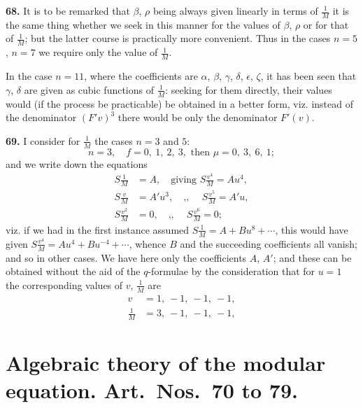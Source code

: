 \documentclass[11pt,a4paper]{book}
\begin{document}
\textbf{68.} It is to be remarked that $\beta$, $\rho$ being always given linearly in terms of $\frac{1}{M}$ it is the same thing whether we seek in this manner for the values of $\beta$, $\rho$ or for that of $\frac{1}{M}$; but the latter course is practically more convenient. Thus in the cases $n = 5$, $n = 7$ we require only the value of $\frac{1}{M}$.

In the case $n = 11$, where the coefficients are $\alpha$, $\beta$, $\gamma$, $\delta$, $\epsilon$, $\zeta$, it has been seen that $\gamma$, $\delta$ are given as cubic functions of $\frac{1}{M}$: seeking for them directly, their values would (if the process be practicable) be obtained in a better form, viz. instead of the denominator $(F'v)^3$ there would be only the denominator $F'(v)$.

\textbf{69.} I consider for $\frac{1}{M}$ the cases $n = 3$ and $5$:
\[
n = 3, \quad f = 0, \ 1, \ 2, \ 3, \text{ then } \mu = 0, \ 3, \ 6, \ 1;
\]
and we write down the equations
\begin{align*}
S\frac{1}{M} &= A, \quad \text{giving } S\frac{v^4}{M} = Au^4, \\
S\frac{v}{M} &= A'u^3, \quad \text{,, } \quad S\frac{v^5}{M} = A'u, \\
S\frac{v^2}{M} &= 0, \quad \text{,, } \quad S\frac{v^6}{M} = 0;
\end{align*}
viz. if we had in the first instance assumed $S\frac{1}{M} = A + Bu^8 + \cdots$, this would have given $S\frac{v^4}{M} = Au^4 + Bu^{-\!4} + \cdots$, whence $B$ and the succeeding coefficients all vanish; and so in other cases. We have here only the coefficients $A$, $A'$; and these can be obtained without the aid of the $q$-formulae by the consideration that for $u = 1$ the corresponding values of $v$, $\frac{1}{M}$ are
\begin{align*}
v &= 1, \ -1, \ -1, \ -1, \\
\frac{1}{M} &= 3, \ -1, \ -1, \ -1,
\end{align*}




\section*{Algebraic theory of the modular equation. Art.~Nos.~70 to 79.}
\end{document}
